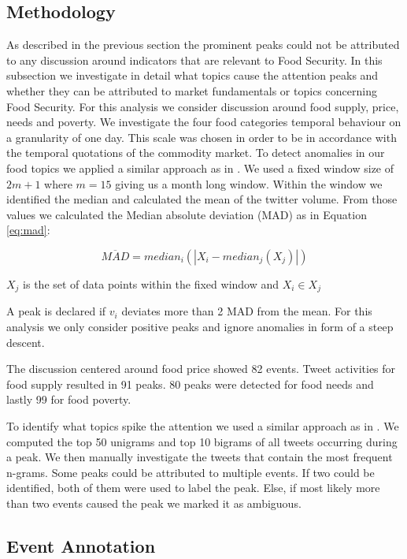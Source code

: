 \subsection{Methodology} 

As described in the previous section the prominent peaks could not be attributed to any discussion around indicators that are relevant to Food Security. In this subsection we investigate in detail what topics cause the attention peaks and whether they can be attributed to market fundamentals or topics concerning Food Security. For this analysis we consider discussion around food supply, price, needs and poverty. 
We investigate the four food categories temporal behaviour on a granularity of one day. This scale was chosen in order to be in accordance with the temporal quotations of the commodity market. 
To detect anomalies in our food topics we applied a similar approach as in \cite{olt15} \cite{Lehmann2012}. We used a fixed window size of $2m + 1$  where $m = 15$ giving us a month long window. Within the window we identified the median and calculated the mean of the twitter volume. From those values we calculated the Median absolute deviation (MAD) as in Equation \ref{eq:mad}: 

\begin{equation} \label{eq:mad}
\overline{ MAD } = median_i (|X_i - median_j(X_j)|)\end{equation}


$X_j$ is the set of data points within the fixed window and $X_i \in X_j$

A peak is declared if $v_i$ deviates more than 2 MAD from the mean. For this analysis we only consider positive peaks and ignore anomalies in form of a steep descent. 

The discussion centered around food price showed 82 events. Tweet activities for food supply resulted in 91 peaks. 80 peaks were detected for food needs and lastly 99 for food poverty. 
 

To identify what topics spike the attention we used a similar approach as in \cite{olt15}. We computed the top 50 unigrams and top 10 bigrams of all tweets occurring during a peak. We then manually investigate the tweets that contain the most frequent n-grams. Some peaks could be attributed to multiple events. If two could be identified, both of them were used to label the peak. Else, if most likely more than two events caused the peak we marked it as ambiguous.  

\subsection{Event Annotation}


